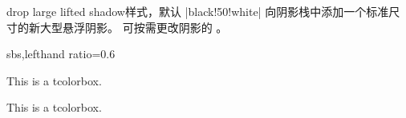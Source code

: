 \begin{docTcbKey}{drop large lifted shadow}{}{样式，默认 |black!50!white|}
  向阴影栈中添加一个标准尺寸的新大型悬浮阴影。
  可按需更改阴影的 。
\begin{dispExample*}{sbs,lefthand ratio=0.6}

\begin{tcolorbox}
This is a tcolorbox.
\end{tcolorbox}\par\bigskip
\begin{tcolorbox}[title=Another shadow,
  drop large lifted shadow=blue]
This is a tcolorbox.
\end{tcolorbox}
\end{dispExample*}
\end{docTcbKey}


\clearpage

